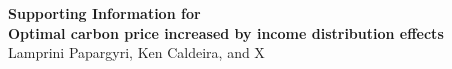 
\begin{center}
{\Large\bfseries Supporting Information for}\\[6pt]
{\large\bfseries Optimal carbon price increased by income distribution effects}\\[4pt]
{Lamprini Papargyri, Ken Caldeira, and X}
\end{center}

